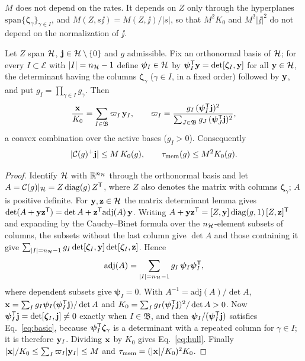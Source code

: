 $M$ does not depend on the rates. It depends on $Z$ only through the hyperplanes
$\mathrm{span}\{\bm\zeta_\gamma\}_{\gamma\in I}$, and $M(Z,s\jj)=M(Z,\jj)/|s|$, so that $M^2K_0$ and
$M^2|\jj|^2$ do not depend on the normalization of $\jj$.

\begin{theorem}\label{thm:cone}
Let $Z$ span $\mathcal H$, $\mathbf j\in\mathcal H\setminus\{0\}$ and $g$ admissible. Fix an orthonormal basis of $\mathcal H$;
for every $I\subset\mathcal E$ with $|I|=n_{\mathcal H}-1$ define $\bm\psi_I\in\mathcal H$ by $\bm\psi_I^{\mathsf T}\mathbf y=\det[\bm\zeta_I,\mathbf y]$ for all
$\mathbf y\in\mathcal H$, the determinant having the columns $\bm\zeta_\gamma$ ($\gamma\in I$, in a fixed order)
followed by $\mathbf y$, and put $g_I=\prod_{\gamma\in I}g_\gamma$. Then
\begin{equation}
\frac{\mathbf x}{K_0}=\sum_{I\in\mathfrak B}\varpi_I\,\mathbf y_I,\qquad
\varpi_I=\frac{g_I\,(\bm\psi_I^{\mathsf T}\mathbf j)^2}{\sum_{J\in\mathfrak B}g_J\,(\bm\psi_J^{\mathsf T}\mathbf j)^2},
\label{eq:hull}
\end{equation}
a convex combination over the active bases ($g_I>0$). Consequently
\begin{equation}
|\mathcal C(g)^+\mathbf j|\le M\,K_0(g),\qquad \tau_{\rm mem}(g)\le M^2K_0(g).
\label{eq:conebound}
\end{equation}
\end{theorem}

\begin{proof}
Identify $\mathcal H$ with $\mathbb R^{n_{\mathcal H}}$ through the orthonormal basis and let
$A=\mathcal C(g)|_{\mathcal H}=Z\,\mathrm{diag}(g)\,Z^{\mathsf T}$, where $Z$ also denotes the matrix with columns
$\bm\zeta_\gamma$; $A$ is positive definite. For $\mathbf y,\mathbf z\in\mathcal H$ the matrix determinant lemma gives
$\det(A+\mathbf y\mathbf z^{\mathsf T})=\det A+\mathbf z^{\mathsf T}\mathrm{adj}(A)\,\mathbf y$. Writing
$A+\mathbf y\mathbf z^{\mathsf T}=[Z,\mathbf y]\,\mathrm{diag}(g,1)\,[Z,\mathbf z]^{\mathsf T}$ and expanding by the Cauchy--Binet formula
over the $n_{\mathcal H}$-element subsets of columns, the subsets without the last column give $\det A$ and
those containing it give $\sum_{|I|=n_{\mathcal H}-1}g_I\det[\bm\zeta_I,\mathbf y]\det[\bm\zeta_I,\mathbf z]$. Hence
\begin{equation}
\mathrm{adj}(A)=\sum_{|I|=n_{\mathcal H}-1}g_I\,\bm\psi_I\bm\psi_I^{\mathsf T} ,
\label{eq:adj}
\end{equation}
where dependent subsets give $\bm\psi_I=0$. With $A^{-1}=\mathrm{adj}(A)/\det A$,
$\mathbf x=\sum_Ig_I\bm\psi_I(\bm\psi_I^{\mathsf T}\mathbf j)/\det A$ and $K_0=\sum_Ig_I(\bm\psi_I^{\mathsf T}\mathbf j)^2/\det A>0$. Now
$\bm\psi_I^{\mathsf T}\mathbf j=\det[\bm\zeta_I,\mathbf j]\ne0$ exactly when $I\in\mathfrak B$, and then
$\bm\psi_I/(\bm\psi_I^{\mathsf T}\mathbf j)$ satisfies Eq.~\eqref{eq:basic}, because $\bm\psi_I^{\mathsf T}\bm\zeta_\gamma$ is a
determinant with a repeated column for $\gamma\in I$; it is therefore $\mathbf y_I$. Dividing $\mathbf x$ by $K_0$
gives Eq.~\eqref{eq:hull}. Finally $|\mathbf x|/K_0\le\sum_I\varpi_I|\mathbf y_I|\le M$ and
$\tau_{\rm mem}=(|\mathbf x|/K_0)^2K_0$.
\end{proof}

